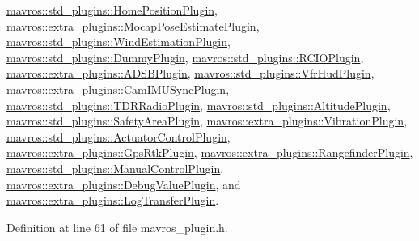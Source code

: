 \mbox{\hyperlink{group__plugin_ga79d40eaf420dfce7a44db82cc6b46331}{mavros\+::std\+\_\+plugins\+::\+Home\+Position\+Plugin}}, \mbox{\hyperlink{group__plugin_ga28f24bffc57ef681f8c61dfbcc53478c}{mavros\+::extra\+\_\+plugins\+::\+Mocap\+Pose\+Estimate\+Plugin}}, \mbox{\hyperlink{group__plugin_ga6811f85521065b479c973b2d82353927}{mavros\+::std\+\_\+plugins\+::\+Wind\+Estimation\+Plugin}}, \mbox{\hyperlink{group__plugin_gaea785dd0427ba4c5f2c0de94da43285f}{mavros\+::std\+\_\+plugins\+::\+Dummy\+Plugin}}, \mbox{\hyperlink{group__plugin_ga96ac58aa9a228dc59d676fdde7909bf5}{mavros\+::std\+\_\+plugins\+::\+R\+C\+I\+O\+Plugin}}, \mbox{\hyperlink{group__plugin_ga15664310460e851e8bb761ce18c68677}{mavros\+::extra\+\_\+plugins\+::\+A\+D\+S\+B\+Plugin}}, \mbox{\hyperlink{group__plugin_gacf050334e6d790e496ca5a35a5e34f2d}{mavros\+::std\+\_\+plugins\+::\+Vfr\+Hud\+Plugin}}, \mbox{\hyperlink{group__plugin_ga6f1ea337208a0cc239f23025209b8be8}{mavros\+::extra\+\_\+plugins\+::\+Cam\+I\+M\+U\+Sync\+Plugin}}, \mbox{\hyperlink{group__plugin_ga396d464187dbf5852122abce024b6acd}{mavros\+::std\+\_\+plugins\+::\+T\+D\+R\+Radio\+Plugin}}, \mbox{\hyperlink{group__plugin_ga5aeb9ab8ababf66ba15c0bf2705c6162}{mavros\+::std\+\_\+plugins\+::\+Altitude\+Plugin}}, \mbox{\hyperlink{group__plugin_gae1ffa70f4b88baa719fdcc22b7b739b6}{mavros\+::std\+\_\+plugins\+::\+Safety\+Area\+Plugin}}, \mbox{\hyperlink{group__plugin_gaa344b18446d091fdcc0d29f71de47b59}{mavros\+::extra\+\_\+plugins\+::\+Vibration\+Plugin}}, \mbox{\hyperlink{group__plugin_ga5da058a4de90d9d0a05ff7b66f6d108b}{mavros\+::std\+\_\+plugins\+::\+Actuator\+Control\+Plugin}}, \mbox{\hyperlink{group__plugin_ga4d0ded3217149d886fba09768c5093ca}{mavros\+::extra\+\_\+plugins\+::\+Gps\+Rtk\+Plugin}}, \mbox{\hyperlink{group__plugin_gad13e24eaf9016887b2544eb816ab3327}{mavros\+::extra\+\_\+plugins\+::\+Rangefinder\+Plugin}}, \mbox{\hyperlink{group__plugin_ga20c1a742c3270e32e681f08f79199451}{mavros\+::std\+\_\+plugins\+::\+Manual\+Control\+Plugin}}, \mbox{\hyperlink{group__plugin_ga2f1235653fca1e9789a8e0842db27743}{mavros\+::extra\+\_\+plugins\+::\+Debug\+Value\+Plugin}}, and \mbox{\hyperlink{classmavros_1_1extra__plugins_1_1LogTransferPlugin_a9b51f52d0ba0538c8dc08b79e35b42f8}{mavros\+::extra\+\_\+plugins\+::\+Log\+Transfer\+Plugin}}.



Definition at line 61 of file mavros\+\_\+plugin.\+h.

\mbox{\label{group__plugin_gaea43cccb03d7eed62db5d9e9bfc3912a}} 
